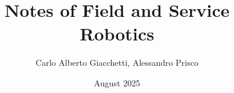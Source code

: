 \documentclass{book}
\title{Notes of Field and Service Robotics}
\author{Carlo Alberto Giacchetti, Alessandro Prisco}
\date{August 2025}
\begin{document}
\setcounter{secnumdepth}{3}
\setcounter{tocdepth}{3}

\makeatletter
\let\oldendproof\endproof
\def\endproof{\oldendproof\aftergroup\@afterindentfalse\aftergroup\@afterheading}

\newtheorem{theorem}{Theorem}
\newtheorem{lemma}{Lemma}[section]
\theoremstyle{definition}
\newtheorem{definition}{Definition}[section]
\makeatother
\maketitle
\makeatletter
\renewcommand*\env@matrix[1][\arraystretch]{%
  \edef\arraystretch{#1}%
  \hskip -\arraycolsep
  \let\@ifnextchar\new@ifnextchar
  \array{*\c@MaxMatrixCols c}}
\makeatother
\tableofcontents

\newpage
\maketitle
\newpage
	  \newpage
  \newpage
 \newpage
 \newpage
 \newpage             
           
\end{document}
